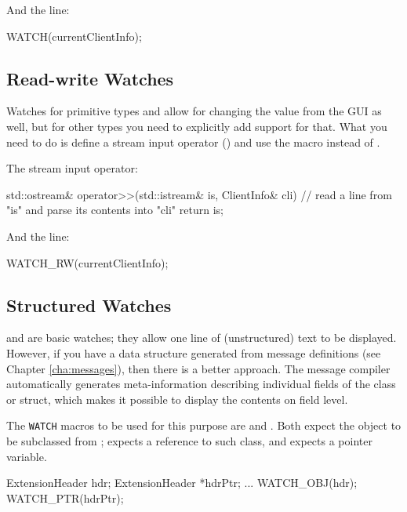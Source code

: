And the  line:

\begin{cpp}
WATCH(currentClientInfo);
\end{cpp}


\subsection{Read-write Watches}
\label{sec:sim-lib:read-write-watches}

Watches for primitive types and  allow for changing
the value from the GUI as well, but for other types you need to explicitly
add support for that. What you need to do is define a stream input
operator () and use the  macro instead of
.

The stream input operator:

\begin{cpp}
std::ostream& operator>>(std::istream& is, ClientInfo& cli)
{
    // read a line from "is" and parse its contents into "cli"
    return is;
}
\end{cpp}

And the  line:

\begin{cpp}
WATCH_RW(currentClientInfo);
\end{cpp}


\subsection{Structured Watches}
\label{sec:sim-lib:structured-watches}

 and  are basic watches; they allow one
line of (unstructured) text to be displayed. However, if you have a
data structure generated from message definitions (see Chapter \ref{cha:messages}),
then there is a better approach. The message compiler automatically generates
meta-information describing individual fields of the class or struct,
which makes it possible to display the contents on field level.

The \texttt{WATCH} macros to be used for this purpose are 
and . Both expect the object to be subclassed from
;  expects a reference to such class,
and  expects a pointer variable.

\begin{cpp}
ExtensionHeader hdr;
ExtensionHeader *hdrPtr;
...
WATCH_OBJ(hdr);
WATCH_PTR(hdrPtr);
\end{cpp}

